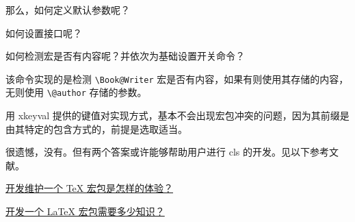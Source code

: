   那么，如何定义默认参数呢？
\begin{texlist}
\end{texlist}

  如何设置接口呢？
\begin{texlist}
  \newcommand{\HTset}[1]{\setkeys{HTNotes.cls}{#1}}
\end{texlist}

  如何检测宏是否有内容呢？并依次为基础设置开关命令？
\begin{texlist}
  \ifdefempty{\Book@Writer}{\@author}{\Book@Writer}
\end{texlist}
  该命令实现的是检测 \verb|\Book@Writer| 宏是否有内容，如果有则使用其存储的内容，无则使用 \verb|\@author| 存储的参数。

  用 xkeyval 提供的键值对实现方式，基本不会出现宏包冲突的问题，因为其前缀是由其特定的包含方式的，前提是选取适当。


  很遗憾，没有。但有两个答案或许能够帮助用户进行 cls 的开发。见以下参考文献。

  \begin{reference}
    \item \href{https://www.zhihu.com/question/27679135/answer/37610214}{开发维护一个 TeX 宏包是怎样的体验？}
    \item \href{https://www.zhihu.com/question/27017364/answer/34932199}{开发一个 LaTeX 宏包需要多少知识？}
  \end{reference}